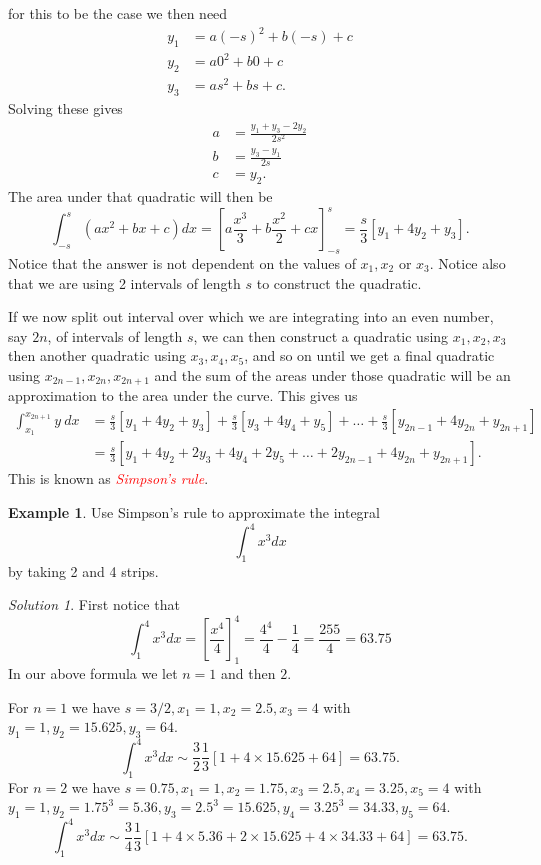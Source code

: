 \documentclass[
  11pt,
  oneside]{book}
\newcommand{\slide}{}
\theoremstyle{definition}
\theoremstyle{definition}
\newtheorem{example}{Example}[chapter]
\theoremstyle{definition}
\theoremstyle{definition}
\theoremstyle{remark}
\newtheorem*{solution}{Solution}
\begin{document}
for this to be the case we then need
\begin{align*}
y_1&=a(-s)^2+b(-s)+c\\
y_2&=a0^2+b0+c\\
y_3&=as^2+bs+c.
\end{align*}
Solving these gives
\begin{align*}
a&=\frac{y_1+y_3-2y_2}{2s^2}\\
b&=\frac{y_3-y_1}{2s}\\
c&=y_2.
\end{align*}
The area under that quadratic will then be
\[
\int_{-s}^{s}(ax^2+bx+c)dx = \left[a\frac{x^3}3+b\frac{x^2}2+cx\right]_{-s}^{s}=\frac{s}{3}\left[y_1+4y_2+y_3\right].
\]
Notice that the answer is not dependent on the values of \(x_1, x_2\) or \(x_3\). Notice also that we are using 2 intervals of length \(s\) to construct the quadratic.

If we now split out interval over which we are integrating into an even number, say \(2n\), of intervals of length \(s\), we can then construct a quadratic using \(x_1, x_2, x_3\) then another quadratic using \(x_3, x_4, x_5\), and so on until we get a final quadratic using \(x_{2n-1},x_{2n},x_{2n+1}\) and the sum of the areas under those quadratic will be an approximation to the area under the curve. This gives us
\begin{align*}
\int_{x_1}^{x_{2n+1}}y\ dx& = \frac s3\left[y_1+4y_2+y_3\right] + \frac s3\left[y_3+4y_4+y_5\right] + \ldots + \frac s3\left[y_{2n-1}+4y_{2n}+y_{2n+1}\right]\\
&=\frac s3\left[y_1+4y_2+2y_3+4y_4+2y_5+\ldots +2y_{2n-1}+4y_{2n}+y_{2n+1}\right].
\end{align*}
This is known as \textcolor{red}{\em Simpson's rule}.
\slide

\begin{example}
Use Simpson's rule to approximate the integral
\[
\int_1^4x^3dx
\]
by taking 2 and 4 strips.
\end{example}

\begin{solution}
First notice that
\[
\int_1^4x^3dx = \left[\frac{x^4}4\right]_1^4 = \frac{4^4}4-\frac14 = \frac{255}4=63.75
\]
In our above formula we let \(n=1\) and then \(2\).

For \(n=1\) we have \(s=3/2, x_1=1, x_2=2.5, x_3=4\) with \(y_1=1, y_2=15.625, y_3=64\).
\[
\int_1^4x^3dx\sim\frac32\frac13\left[1+4\times15.625+64\right] = 63.75.
\]
For \(n=2\) we have \(s=0.75, x_1=1, x_2=1.75, x_3=2.5, x_4=3.25, x_5=4\) with \(y_1=1, y_2=1.75^3=5.36, y_3 = 2.5^3=15.625, y_4=3.25^3=34.33, y_5=64\).
\[
\int_1^4x^3dx\sim\frac34\frac13\left[1+4\times5.36+2\times15.625+4\times34.33+64\right] = 63.75.
\]
\end{solution}
\end{document}
